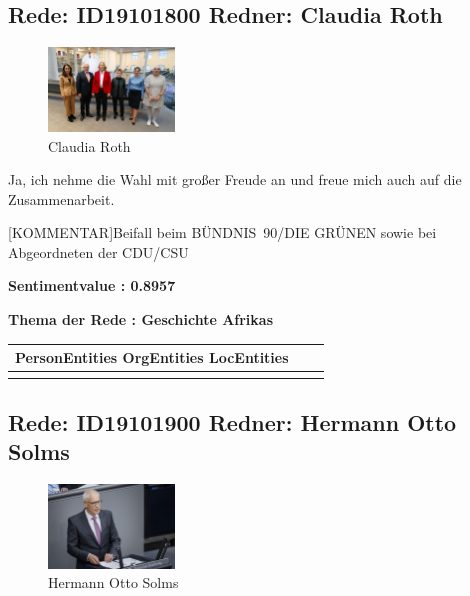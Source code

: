 \documentclass[a4paper,11pt]{article}
\begin{document}
\subsection{Rede: ID19101800  Redner: Claudia Roth}

\begin{figure}[ht]

\centering

\includegraphics[width=0.3\textwidth]{Claudia_Roth.jpg}

\caption{Claudia Roth}

\end{figure}

Ja, ich nehme die Wahl mit großer Freude an und freue mich auch auf die Zusammenarbeit.

[KOMMENTAR]Beifall beim BÜNDNIS 90/DIE GRÜNEN sowie bei Abgeordneten der CDU/CSU


\textbf{Sentimentvalue : 0.8957}

\textbf{Thema der Rede : Geschichte Afrikas}
\vspace*{1cm}

\begin{table}[ht]
\centering
\begin{tabular}{||c | c | c||}
\hline
PersonEntities  OrgEntities  LocEntities \\ 

\hline\hline
\makecell{} 
\makecell{} 
\makecell{}\\
\hline
\end{tabular}
\end{table}
\clearpage


\subsection{Rede: ID19101900  Redner: Hermann Otto Solms}

\begin{figure}[ht]

\centering

\includegraphics[width=0.3\textwidth]{Hermann_Otto_Solms.jpg}

\caption{Hermann Otto Solms}

\end{figure}
\end{document}
